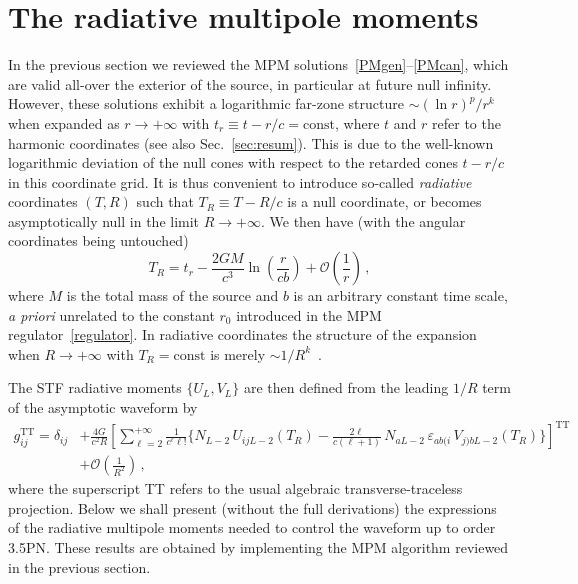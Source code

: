 \documentclass[prd,preprint,superscriptaddress,tightenlines,nofootinbib,
  eqsecnum,showpacs]{revtex4}
\begin{document}
\section{The radiative multipole moments}
\label{sec:rad}

In the previous section we reviewed the MPM
solutions~\eqref{PMgen}--\eqref{PMcan}, which are valid all-over the
exterior of the source, in particular at future null
infinity. However, these solutions exhibit a logarithmic far-zone
structure $\sim (\ln r)^p/r^k$ when expanded as $r\to +\infty$ with
$t_r\equiv t-r/c=\mathrm{const}$, where $t$ and $r$ refer to the
harmonic coordinates (see also Sec.~\ref{sec:resum}). This is due to
the well-known logarithmic deviation of the null cones with respect to
the retarded cones $t-r/c$ in this coordinate grid. It is thus
convenient to introduce so-called \textit{radiative} coordinates $(T,
R)$ such that $T_R\equiv T-R/c$ is a null coordinate, or becomes
asymptotically null in the limit $R\to +\infty$. We then have (with
the angular coordinates being untouched)
%
\begin{equation}\label{TRtr}
T_R = t_r -\frac{2 G
  M}{c^3}\ln\left(\frac{r}{c b}\right) +
\mathcal{O}\left(\frac{1}{r}\right)\,,
\end{equation}
%
where $M$ is the total mass of the source and $b$ is an arbitrary
constant time scale, \textit{a priori} unrelated to the constant $r_0$
introduced in the MPM regulator~\eqref{regulator}. In radiative
coordinates the structure of the expansion when $R\to +\infty$ with
$T_R=\mathrm{const}$ is merely $\sim 1/R^k$~\cite{B87}.

The STF radiative moments $\{U_L, V_L\}$ are then defined from the
leading $1/R$ term of the asymptotic waveform by~\cite{Th80}
%
\begin{align} \label{gijTT}
g_{ij}^\text{TT} = \delta_{ij} &+ \frac{4G}{c^2R}
\left[\sum^{+\infty}_{\ell=2}\frac{1}{c^\ell \ell !} \biggl\{ N_{L-2}
  \, U_{ijL-2}(T_R) - \frac{2\ell}{c(\ell+1)} \, N_{aL-2}
  \,\varepsilon_{ab(i} \, V_{j)bL-2}(T_R)\biggr\}\right]^\text{TT}
\nonumber\\ & + \mathcal{O}\left(\frac{1}{R^2}\right)\,,
\end{align}
%
where the superscript TT refers to the usual algebraic
transverse-traceless projection. Below we shall present (without the
full derivations) the expressions of the radiative multipole moments
needed to control the waveform up to order 3.5PN. These results are
obtained by implementing the MPM algorithm reviewed in the previous
section.
\end{document}
